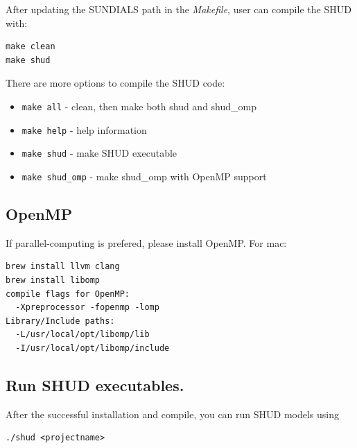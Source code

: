 \documentclass[]{scrbook}
\providecommand{\tightlist}{%
  \setlength{\itemsep}{0pt}\setlength{\parskip}{0pt}}
\begin{document}
After updating the SUNDIALS path in the \emph{Makefile}, user can
compile the SHUD with:

\begin{verbatim}
make clean
make shud
\end{verbatim}

There are more options to compile the SHUD code:

\begin{itemize}
\tightlist
\item
  \texttt{make\ all} - clean, then make both shud and shud\_omp
\item
  \texttt{make\ help} - help information
\item
  \texttt{make\ shud} - make SHUD executable
\item
  \texttt{make\ shud\_omp} - make shud\_omp with OpenMP support
\end{itemize}

\subsection{OpenMP}\label{openmp}

If parallel-computing is prefered, please install OpenMP. For mac:

\begin{verbatim}
brew install llvm clang
brew install libomp
compile flags for OpenMP: 
  -Xpreprocessor -fopenmp -lomp
Library/Include paths:
  -L/usr/local/opt/libomp/lib 
  -I/usr/local/opt/libomp/include
\end{verbatim}

\subsection{Run SHUD executables.}\label{run-shud-executables.}

After the successful installation and compile, you can run SHUD models
using

\begin{verbatim}
./shud <projectname>
\end{verbatim}
\end{document}
